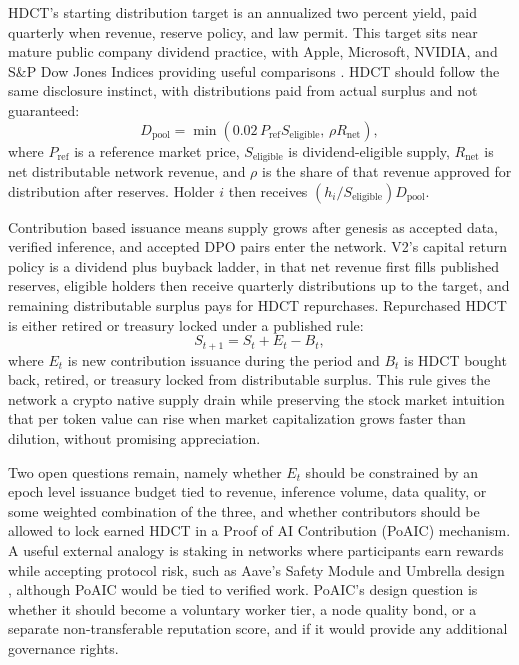 \documentclass[10pt,a4paper,twocolumn]{article}
\begin{document}
HDCT's starting distribution target is an annualized two percent yield, paid quarterly when revenue, reserve policy, and law permit. This target sits near mature public company dividend practice, with Apple, Microsoft, NVIDIA, and S\&P Dow Jones Indices providing useful comparisons \citep{apple2026dividend,microsoft2026dividend,nvidia2025q3,spglobal2026dividends}. HDCT should follow the same disclosure instinct, with distributions paid from actual surplus and not guaranteed:
\[
D_{\mathrm{pool}}=\min(0.02\,P_{\mathrm{ref}}S_{\mathrm{eligible}},\,\rho R_{\mathrm{net}}),
\]
where $P_{\mathrm{ref}}$ is a reference market price, $S_{\mathrm{eligible}}$ is dividend-eligible supply, $R_{\mathrm{net}}$ is net distributable network revenue, and $\rho$ is the share of that revenue approved for distribution after reserves. Holder $i$ then receives $(h_i/S_{\mathrm{eligible}})D_{\mathrm{pool}}$.

Contribution based issuance means supply grows after genesis as accepted data, verified inference, and accepted DPO pairs enter the network. V2's capital return policy is a dividend plus buyback ladder, in that net revenue first fills published reserves, eligible holders then receive quarterly distributions up to the target, and remaining distributable surplus pays for HDCT repurchases. Repurchased HDCT is either retired or treasury locked under a published rule:
\[
S_{t+1}=S_t+E_t-B_t,
\]
where $E_t$ is new contribution issuance during the period and $B_t$ is HDCT bought back, retired, or treasury locked from distributable surplus. This rule gives the network a crypto native supply drain while preserving the stock market intuition that per token value can rise when market capitalization grows faster than dilution, without promising appreciation.

Two open questions remain, namely whether $E_t$ should be constrained by an epoch level issuance budget tied to revenue, inference volume, data quality, or some weighted combination of the three, and whether contributors should be allowed to lock earned HDCT in a Proof of AI Contribution (PoAIC) mechanism. A useful external analogy is staking in networks where participants earn rewards while accepting protocol risk, such as Aave's Safety Module and Umbrella design \citep{aave2026umbrella}, although PoAIC would be tied to verified work. PoAIC's design question is whether it should become a voluntary worker tier, a node quality bond, or a separate non-transferable reputation score, and if it would provide any additional governance rights.
\end{document}
